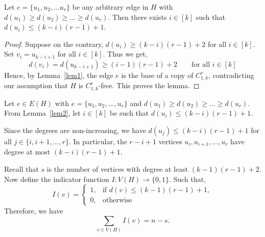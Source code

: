 \documentclass[12pt]{article}
\begin{document}
\begin{lemma}\label{lem2}
    Let $e = \{u_1,u_2,\dots u_r\}$ be any arbitrary edge in $H$ with $d(u_1) \geq d(u_2) \geq\dots \geq d(u_r)$. Then there exists $i \in [k]$ such that $d(u_i) \leq (k-i)(r-1) +1$.
\end{lemma}
\begin{proof}
    Suppose on the contrary, $d(u_i) \geq (k-i)(r-1) +2$ for all $ i \in [k]$. Set $v_i = u_{k-i+1}$ for all $i \in [k]$. Thus we get,
    $$d(v_i) = d(u_{k-i+1}) \geq (i-1)(r-1) +2 \qquad \text{for all $i \in [k]$}$$
    Hence, by Lemma~\ref{lem1}, the edge $e$ is the base of a copy of
$C_{1,k}^r$, contradicting our assumption that $H$ is $C_{1,k}^r$-free.
This proves the lemma.
\end{proof}
Let $e \in E(H)$ with $e = \{u_1,u_2,\dots,u_r\}$ and $d(u_1) \geq d(u_2)\geq \dots \geq d(u_r)$. From Lemma~\ref{lem2}, let $i \in [k]$ be such that $d(u_i) \leq (k-i)(r-1) +1$. 

Since the degrees are non-increasing, we have $d(u_j) \leq (k-i)(r-1) +1$ for all $j \in \{i, i+1,\dots, r\}$. In particular, the $r-i+1$ vertices $u_i,u_{i+1},\dots,u_{r}$ have degree at most $(k-i)(r-1)+1$.

Recall that $s$ is the number of vertices with degree at least $(k-1)(r-1)+2$. Now define the indicator function $I: V(H) \rightarrow \{0,1\}$. Such that,
$$I(v)=
\begin{cases}
1, & \text{if $d(v) \leq (k-1)(r-1)+1$},\\
0,& \text{otherwise}
\end{cases}$$
Therefore,  we have \begin{equation}\label{eqn1}
    \sum_{v \in V(H)} I(v) = n-s.
\end{equation}
\end{document}
